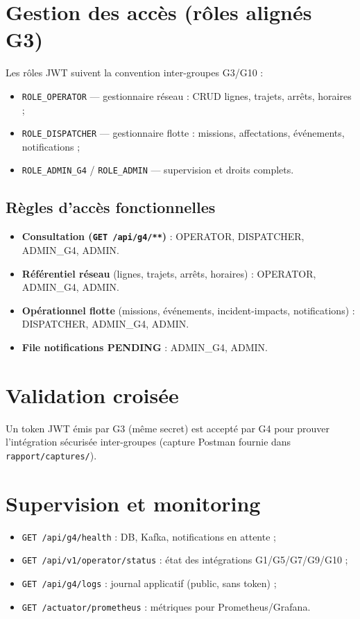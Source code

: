 \documentclass[12pt,a4paper]{report}
\begin{document}
\section{Gestion des accès (rôles alignés G3)}
Les rôles JWT suivent la convention inter-groupes G3/G10 :
\begin{itemize}
  \item \texttt{ROLE\_OPERATOR} — gestionnaire réseau : CRUD lignes, trajets, arrêts, horaires ;
  \item \texttt{ROLE\_DISPATCHER} — gestionnaire flotte : missions, affectations, événements, notifications ;
  \item \texttt{ROLE\_ADMIN\_G4} / \texttt{ROLE\_ADMIN} — supervision et droits complets.
\end{itemize}

\subsection*{Règles d'accès fonctionnelles}
\begin{itemize}
  \item \textbf{Consultation (\texttt{GET /api/g4/**})} : OPERATOR, DISPATCHER, ADMIN\_G4, ADMIN.
  \item \textbf{Référentiel réseau} (lignes, trajets, arrêts, horaires) : OPERATOR, ADMIN\_G4, ADMIN.
  \item \textbf{Opérationnel flotte} (missions, événements, incident-impacts, notifications) : DISPATCHER, ADMIN\_G4, ADMIN.
  \item \textbf{File notifications PENDING} : ADMIN\_G4, ADMIN.
\end{itemize}

\section{Validation croisée}
Un token JWT émis par G3 (même secret) est accepté par G4 pour prouver l'intégration sécurisée inter-groupes (capture Postman fournie dans \texttt{rapport/captures/}).

\section{Supervision et monitoring}
\begin{itemize}
  \item \texttt{GET /api/g4/health} : DB, Kafka, notifications en attente ;
  \item \texttt{GET /api/v1/operator/status} : état des intégrations G1/G5/G7/G9/G10 ;
  \item \texttt{GET /api/g4/logs} : journal applicatif (public, sans token) ;
  \item \texttt{GET /actuator/prometheus} : métriques pour Prometheus/Grafana.
\end{itemize}
\end{document}
